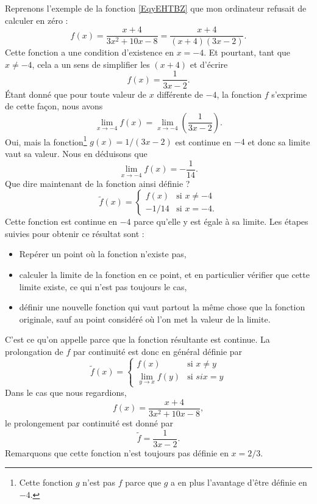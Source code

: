 Reprenons l'exemple de la fonction \eqref{EqyEHTBZ} que mon ordinateur refusait de calculer en zéro :
\begin{equation}
	f(x)=\frac{ x+4 }{ 3x^2+10x-8 }=\frac{ x+4 }{ (x+4)(3x-2) }.
\end{equation}
Cette fonction a une condition d'existence en \( x=-4\). Et pourtant, tant que \( x\neq -4\), cela a un sens de simplifier les \( (x+4)\) et d'écrire
\[
	f(x)=\frac{ 1 }{ 3x-2 }.
\]
Étant donné que pour toute valeur de \( x\) différente de \( -4\), la fonction \( f\) s'exprime de cette façon, nous avons
\[
	\lim_{x\to -4}f(x)=\lim_{x\to -4}\left(\frac{ 1 }{ 3x-2 }\right).
\]
Oui, mais la fonction\footnote{Cette fonction \( g\) n'est pas \( f\) parce que \( g\) a en plus l'avantage d'être définie en \( -4\).} \( g(x)=1/(3x-2)\) est continue en \( -4\) et donc sa limite vaut sa valeur. Nous en déduisons que
\[
	\lim_{x\to -4}f(x)=-\frac{ 1 }{ 14 }.
\]
Que dire maintenant de la fonction ainsi définie ?
\begin{equation}
	\tilde f(x)=
	\begin{cases}
		f(x)  & \text{si }x\neq -4 \\
		-1/14 & \text{si }x=-4.
	\end{cases}
\end{equation}
Cette fonction est continue en \( -4\) parce qu'elle y est égale à sa limite. Les étapes suivies pour obtenir ce résultat sont :
\begin{itemize}
	\item Repérer un point où la fonction n'existe pas,
	\item calculer la limite de la fonction en ce point, et en particulier vérifier que cette limite existe, ce qui n'est pas toujours le cas,
	\item définir une nouvelle fonction qui vaut partout la même chose que la fonction originale, sauf au point considéré où l'on met la valeur de la limite.
\end{itemize}
C'est ce qu'on appelle  parce que la fonction résultante est continue. La prolongation de \( f\) par continuité est donc en général définie par
\begin{equation}
	\tilde f(x)=
	\begin{cases}
		f(x)              & \text{si }x\neq y \\
		\lim_{y\to x}f(y) & \text{si }si x=y
	\end{cases}
\end{equation}
Dans le cas que nous regardions,
\[
	f(x)=\frac{ x+4 }{ 3x^2+10x-8 },
\]
le prolongement par continuité est donné par
\begin{equation}
	\tilde f =\frac{ 1 }{ 3x-2 }.
\end{equation}
Remarquons que cette fonction n'est toujours pas définie en \( x=2/3\).


